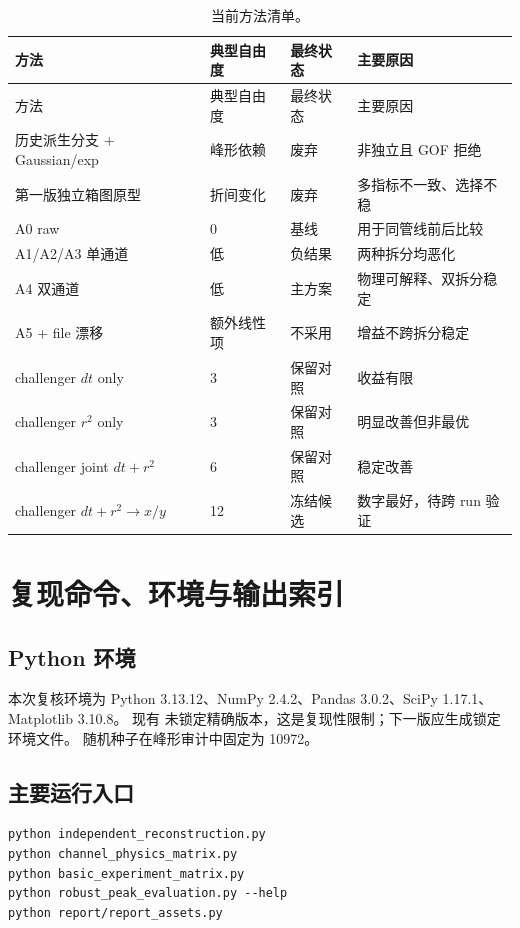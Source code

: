 \documentclass[UTF8,12pt,a4paper,oneside,fontset=none]{ctexart}
\numberwithin{equation}{section}
\begin{document}
\begin{longtable}{p{4.0cm} p{2.2cm} p{3.0cm} p{3.0cm}}
\caption{当前方法清单。}
\label{tab:method-index}\\
\toprule
方法 & 典型自由度 & 最终状态 & 主要原因 \\
\midrule
\endfirsthead
\toprule
方法 & 典型自由度 & 最终状态 & 主要原因 \\
\midrule
\endhead
历史派生分支 + Gaussian/exp & 峰形依赖 & 废弃 & 非独立且 GOF 拒绝 \\
第一版独立箱图原型 & 折间变化 & 废弃 & 多指标不一致、选择不稳 \\
A0 raw & 0 & 基线 & 用于同管线前后比较 \\
A1/A2/A3 单通道 & 低 & 负结果 & 两种拆分均恶化 \\
A4 双通道 & 低 & 主方案 & 物理可解释、双拆分稳定 \\
A5 + file 漂移 & 额外线性项 & 不采用 & 增益不跨拆分稳定 \\
challenger \(dt\) only & 3 & 保留对照 & 收益有限 \\
challenger \(r^2\) only & 3 & 保留对照 & 明显改善但非最优 \\
challenger joint \(dt+r^2\) & 6 & 保留对照 & 稳定改善 \\
challenger \(dt+r^2\rightarrow x/y\) & 12 & 冻结候选 & 数字最好，待跨 run 验证 \\
\bottomrule
\end{longtable}

\clearpage
\section{复现命令、环境与输出索引}

\subsection{Python 环境}

本次复核环境为 Python 3.13.12、NumPy 2.4.2、Pandas 3.0.2、SciPy 1.17.1、Matplotlib 3.10.8。
现有  未锁定精确版本，这是复现性限制；下一版应生成锁定环境文件。
随机种子在峰形审计中固定为 10972。

\subsection{主要运行入口}

\begin{lstlisting}
python independent_reconstruction.py
python channel_physics_matrix.py
python basic_experiment_matrix.py
python robust_peak_evaluation.py --help
python report/report_assets.py
\end{lstlisting}
\end{document}
